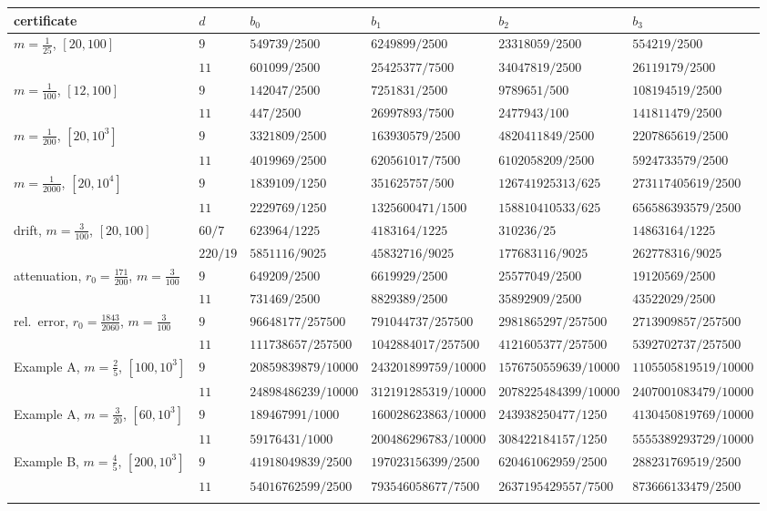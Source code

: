 \begin{tabular}{@{}llllll@{}}\toprule
certificate & $d$ & $b_0$ & $b_1$ & $b_2$ & $b_3$\\\midrule
$m=\tfrac1{25}$, $[20,100]$ & $9$ & $549739/2500$ & $6249899/2500$ & $23318059/2500$ & $554219/2500$\\
 & $11$ & $601099/2500$ & $25425377/7500$ & $34047819/2500$ & $26119179/2500$\\
\addlinespace[2pt]
$m=\tfrac1{100}$, $[12,100]$ & $9$ & $142047/2500$ & $7251831/2500$ & $9789651/500$ & $108194519/2500$\\
 & $11$ & $447/2500$ & $26997893/7500$ & $2477943/100$ & $141811479/2500$\\
\addlinespace[2pt]
$m=\tfrac1{200}$, $[20,10^3]$ & $9$ & $3321809/2500$ & $163930579/2500$ & $4820411849/2500$ & $2207865619/2500$\\
 & $11$ & $4019969/2500$ & $620561017/7500$ & $6102058209/2500$ & $5924733579/2500$\\
\addlinespace[2pt]
$m=\tfrac1{2000}$, $[20,10^4]$ & $9$ & $1839109/1250$ & $351625757/500$ & $126741925313/625$ & $273117405619/2500$\\
 & $11$ & $2229769/1250$ & $1325600471/1500$ & $158810410533/625$ & $656586393579/2500$\\
\addlinespace[2pt]
drift, $m=\tfrac3{100}$, $[20,100]$ & $60/7$ & $623964/1225$ & $4183164/1225$ & $310236/25$ & $14863164/1225$\\
 & $220/19$ & $5851116/9025$ & $45832716/9025$ & $177683116/9025$ & $262778316/9025$\\
\addlinespace[2pt]
attenuation, $r_0=\tfrac{171}{200}$, $m=\tfrac3{100}$ & $9$ & $649209/2500$ & $6619929/2500$ & $25577049/2500$ & $19120569/2500$\\
 & $11$ & $731469/2500$ & $8829389/2500$ & $35892909/2500$ & $43522029/2500$\\
\addlinespace[2pt]
rel.\ error, $r_0=\tfrac{1843}{2060}$, $m=\tfrac3{100}$ & $9$ & $96648177/257500$ & $791044737/257500$ & $2981865297/257500$ & $2713909857/257500$\\
 & $11$ & $111738657/257500$ & $1042884017/257500$ & $4121605377/257500$ & $5392702737/257500$\\
\addlinespace[2pt]
Example A, $m=\tfrac25$, $[100,10^3]$ & $9$ & $20859839879/10000$ & $243201899759/10000$ & $1576750559639/10000$ & $1105505819519/10000$\\
 & $11$ & $24898486239/10000$ & $312191285319/10000$ & $2078225484399/10000$ & $2407001083479/10000$\\
\addlinespace[2pt]
Example A, $m=\tfrac3{20}$, $[60,10^3]$ & $9$ & $189467991/1000$ & $160028623863/10000$ & $243938250477/1250$ & $4130450819769/10000$\\
 & $11$ & $59176431/1000$ & $200486296783/10000$ & $308422184157/1250$ & $5555389293729/10000$\\
\addlinespace[2pt]
Example B, $m=\tfrac45$, $[200,10^3]$ & $9$ & $41918049839/2500$ & $197023156399/2500$ & $620461062959/2500$ & $288231769519/2500$\\
 & $11$ & $54016762599/2500$ & $793546058677/7500$ & $2637195429557/7500$ & $873666133479/2500$\\
\addlinespace[2pt]
\bottomrule
\end{tabular}
